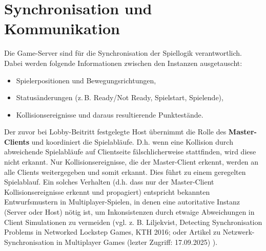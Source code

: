 \section{Synchronisation und Kommunikation}
Die Game-Server sind für die Synchronisation der Spiellogik verantwortlich.  
Dabei werden folgende Informationen zwischen den Instanzen ausgetauscht:
\begin{itemize}
  \item Spielerpositionen und Bewegungsrichtungen,
  \item Statusänderungen (z.\,B. Ready/Not Ready, Spielstart, Spielende),
  \item Kollisionsereignisse und daraus resultierende Punktestände.
\end{itemize}

Der zuvor bei Lobby-Beitritt festgelegte Host übernimmt die Rolle des \textbf{Master-Clients} und koordiniert die Spielabläufe.
D.h. wenn eine Kollision durch abweichende Spielabläufe auf Clientseite fälschlicherweise stattfinden, wird diese nicht erkannt. 
Nur Kollisionsereignisse, die der Master-Client erkennt, werden an alle Clients weitergegeben und somit erkannt. Dies führt zu einem geregelten Spielablauf.
Ein solches Verhalten (d.h. dass nur der Master-Client Kollisionsereignisse erkennt und propagiert) entspricht bekannten Entwurfsmustern in Multiplayer-Spielen, in denen eine autoritative Instanz (Server oder Host) nötig ist, 
um Inkonsistenzen durch etwaige Abweichungen in Client Simulationen zu vermeiden (vgl. z. B. Liljekvist, Detecting Synchronisation Problems in Networked Lockstep Games, KTH 2016; oder Artikel zu Netzwerk-Synchronisation in Multiplayer Games (lezter Zugriff: 17.09.2025) ).